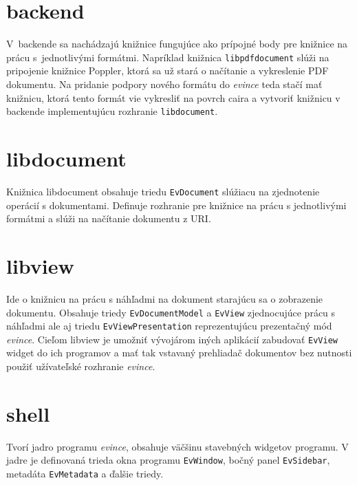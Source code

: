 \documentclass[12pt,oneside,final]{fithesis2}
\begin{document}
\section{backend}
V~backende sa nachádzajú knižnice fungujúce ako prípojné body pre knižnice na prácu s~jednotlivými formátmi. Napríklad knižnica \texttt{libpdfdocument} slúži na pripojenie knižnice Poppler, ktorá sa už stará o načítanie a vykreslenie PDF dokumentu. Na pridanie podpory nového formátu do \emph{evince} teda stačí mať knižnicu, ktorá tento formát vie vykresliť na povrch caira a vytvoriť knižnicu v backende implementujúcu rozhranie \texttt{libdocument}.
\section{libdocument}
Knižnica libdocument obsahuje triedu \texttt{EvDocument} slúžiacu na zjednotenie operácií s dokumentami. Definuje rozhranie pre knižnice na prácu s jednotlivými formátmi a slúži na načítanie dokumentu z URI.
\section{libview}
Ide o knižnicu na prácu s náhľadmi na dokument starajúcu sa o zobrazenie dokumentu. Obsahuje triedy \texttt{EvDocumentModel} a \texttt{EvView} zjednocujúce prácu s náhľadmi ale aj triedu \texttt{EvViewPresentation} reprezentujúcu prezentačný mód \emph{evince}. Cieľom libview je umožniť vývojárom iných aplikácií zabudovať \texttt{EvView} widget do ich programov a mať tak vstavaný prehliadač dokumentov bez nutnosti použiť užívateľské rozhranie \emph{evince}.
\section{shell}
Tvorí jadro programu \emph{evince}, obsahuje väčšinu stavebných widgetov programu. V jadre je definovaná trieda okna programu \texttt{EvWindow}, bočný panel \texttt{EvSidebar}, metadáta \texttt{EvMetadata} a ďalšie triedy.
\end{document}
